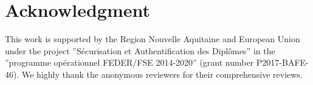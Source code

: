 \documentclass[runningheads]{llncs}
\begin{document}
\section*{Acknowledgment}
This work is supported by the Region Nouvelle Aquitaine and European Union under the project ”Sécurisation et Authentification des Diplômes” in the ”programme opérationnel FEDER/FSE 2014-2020” (grant number P2017-BAFE-46). We highly thank the anonymous reviewers for their comprehensive reviews.  



\end{document}
